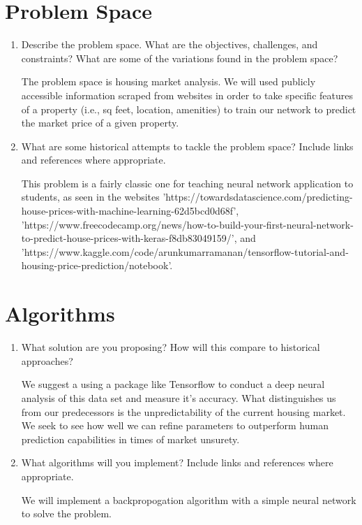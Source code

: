 \documentclass[]{article}
\begin{document}
\section{Problem Space}
\begin{enumerate}
	\item Describe the problem space. What are the objectives, challenges, and constraints? What are some of the variations found in the problem space?
	\vspace{0.5cm}
	
	The problem space is housing market analysis.  We will used publicly accessible information scraped from websites in order to take specific features of a property (i.e., sq feet, location, amenities) to train our network to predict the market price of a given property.

	\item What are some historical attempts to tackle the problem space? Include links and references where appropriate.
	\vspace{0.5cm}
	
	This problem is a fairly classic one for teaching neural network application to students, as seen in the websites 'https://towardsdatascience.com/predicting-house-prices-with-machine-learning-62d5bcd0d68f', 'https://www.freecodecamp.org/news/how-to-build-your-first-neural-network-to-predict-house-prices-with-keras-f8db83049159/', and 'https://www.kaggle.com/code/arunkumarramanan/tensorflow-tutorial-and-housing-price-prediction/notebook'.
\end{enumerate}

\section{Algorithms}
\begin{enumerate}
    \item What solution are you proposing? How will this compare to historical approaches?
    
    We suggest a  using a package like Tensorflow to conduct a deep neural analysis of this data set and measure it's accuracy. What distinguishes us from our predecessors is the unpredictability of the current housing market.  We seek to see how well we can refine parameters to outperform human prediction capabilities in times of market unsurety.
    
    \item What algorithms will you implement? Include links and references where appropriate.
    \vspace{0.5cm}
    
    We will implement a backpropogation algorithm with a simple neural network to solve the problem.
     
\end{enumerate}
\end{document}
